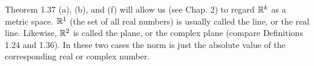 \begin{remark} %
  \label{rem:chap1:metric_space_R1_R2}
  Theorem 1.37 (a), (b), and (f) will allow us (see Chap. 2) to
  regard $\mathbb{R}^k$ as a metric space.
  $\mathbb{R}^1$ (the set of all real numbers) is usually called the line, or
  the real line. Likewise, $\mathbb{R}^2$ is called the plane, or the complex
  plane (compare Definitions 1.24 and 1.36). In these two cases the
  norm is just the absolute value of the corresponding real or complex number.
\end{remark}


